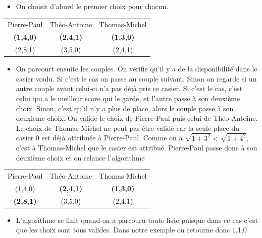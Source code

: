 \documentclass[11pt]{article}
\begin{document}
\begin{itemize}
    \item On choisit d'abord le premier choix pour chacun.
\end{itemize}

\begin{center}
\begin{tabular}{ c| c| c }
    Pierre-Paul & Théo-Antoine & Thomas-Michel \\
  \textbf{(1,4,0)} & \textbf{(2,4,1)} & \textbf{(1,3,0)} \\
 (2,8,1) & (3,5,0) & (2,4,1) \\
 \end{tabular}
\end{center}

\begin{itemize}
    \item On parcourt ensuite les couples. On vérifie qu'il y a de la disponibilité dans le casier voulu. Si c'est le cas on passe au couple suivant. Sinon on regarde si un autre couple avant celui-ci n'a pas déjà pris ce casier. Si c'est le cas, c'est celui qui a le meilleur score qui le garde, et l'autre passe à son deuxième choix. Sinon, c'est qu'il n'y a plus de place, alors le couple passe à son deuxieme choix.  On valide le choix de Pierre-Paul puis celui de Théo-Antoine. Le choix de Thomas-Michel ne peut pas être  validé car la seule place du casier 0 est déjà attribuée à Pierre-Paul. Comme on a $\sqrt{1+3^2}<\sqrt{1+4^2}$, c'est à Thomas-Michel que le casier est attribué. Pierre-Paul passe donc à son deuxième choix et on relance l'algorithme
\end{itemize}

\begin{center}
\begin{tabular}{ c| c| c }
   Pierre-Paul & Théo-Antoine & Thomas-Michel \\
   (1,4,0) & \textbf{(2,4,1)} & \textbf{(1,3,0)} \\
   \textbf{(2,8,1)} & (3,5,0) & (2,4,1) \\
 \end{tabular}
\end{center}

\begin{itemize}
    \item L'algorithme se finit quand on a parcouru toute liste puisque dans ce cas c'est que les choix sont tous valides. Dans notre exemple on retourne donc 1,1,0
\end{itemize}
\end{document}
